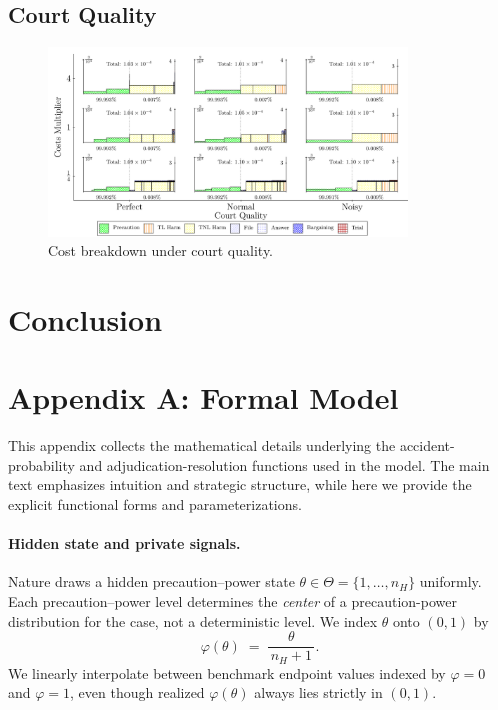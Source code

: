 \documentclass{article}
\begin{document}
\subsection{Court Quality}
\begin{figure}[ht]
  \centering
  \includegraphics[width=0.85\textwidth]{../Figures/Cost Breakdown Court Quality (All Rows).pdf}
  \caption{Cost breakdown under court quality.}
  \label{fig:court_quality}
\end{figure}

\section{Conclusion}

\section*{Appendix A: Formal Model}

This appendix collects the mathematical details underlying the accident-probability and adjudication-resolution functions used in the model. The main text emphasizes intuition and strategic structure, while here we provide the explicit functional forms and parameterizations.

\paragraph{Hidden state and private signals.}
Nature draws a hidden precaution–power state $\theta\in\Theta=\{1,\dots,n_H\}$ uniformly. Each precaution–power level determines the \emph{center} of a precaution-power distribution for the case, not a deterministic level. We index $\theta$ onto $(0,1)$ by
\[
\varphi(\theta)\;=\;\frac{\theta}{\,n_H+1\,}.
\]
We linearly interpolate between benchmark endpoint values indexed by $\varphi=0$ and $\varphi=1$, even though realized $\varphi(\theta)$ always lies strictly in $(0,1)$.
\end{document}
